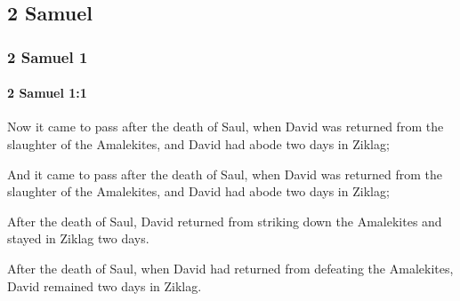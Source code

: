 \subsection{2 Samuel}
	\label{2SAMUEL}

	\subsubsection{2 Samuel 1} %
		\label{2SAMUEL-1}

		\paragraph{2 Samuel 1:1} %
			\label{2SAMUEL-1-1}

			Now it came to pass after the death of Saul, when David was returned from the slaughter of the Amalekites, and David had abode two days in Ziklag;

			\begin{versebox}
					\item[BHS] 
					\item[ASV] And it came to pass after the death of Saul, when David was returned from the slaughter of the Amalekites, and David had abode two days in Ziklag;
					\item[NIV] After the death of Saul, David returned from striking down the Amalekites and stayed in Ziklag two days.
					\item[NRSV] After the death of Saul, when David had returned from defeating the Amalekites, David remained two days in Ziklag.
			\end{versebox}

